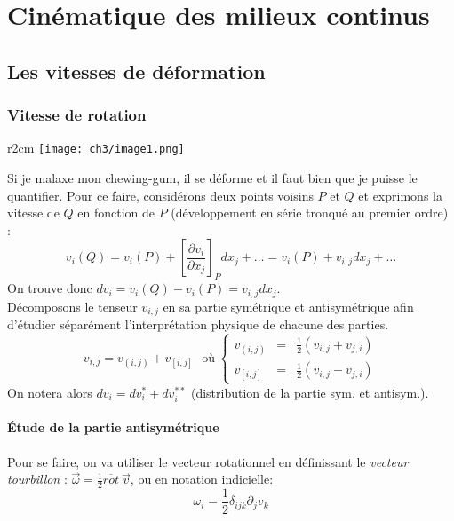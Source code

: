 \chapter{Cinématique des milieux continus}
\section{Les vitesses de déformation}

\subsection{Vitesse de rotation}
\begin{wrapfigure}[6]{r}{2cm}
	\texttt{[image: ch3/image1.png]}
\end{wrapfigure}
Si je malaxe mon chewing-gum, il se déforme et il faut bien que je puisse le quantifier.
Pour ce faire, considérons deux points voisins $P$ et $Q$ et exprimons la vitesse de $Q$
en fonction de $P$ (développement en série tronqué au premier ordre) : 
\begin{equation}
	v_i(Q) = v_i(P) + \left[
	\dfrac{\partial v_i}{\partial x_j}\right]_P dx_j + \dots = v_i(P) + v_{i,j} dx_j + \dots
\end{equation}
On trouve donc $dv_i = v_i(Q) - v_i(P) = v_{i,j}dx_j$.\\
    
Décomposons le tenseur $v_{i,j}$ en sa partie symétrique et antisymétrique afin d'étudier 
séparément l'interprétation physique de chacune des parties.
\begin{equation}
	v_{i,j} = v_{(i,j)} + v_{[i,j]}\ \ \ \text{où}\ \left\{\begin{array}{lll}
	v_{(i,j)} &=& \frac{1}{2}(v_{i,j}+v_{j,i})\\
	v_{[i,j]} &=& \frac{1}{2}(v_{i,j}-v_{j,i})
	\end{array}\right.
\end{equation}
On notera alors $dv_i = dv_i^* + dv_i^{**}$ (distribution de la partie sym. et antisym.).

\subsubsection{Étude de la partie antisymétrique}
Pour se faire, on va utiliser le vecteur rotationnel en définissant le \textit{vecteur
	tourbillon} : $\vec \omega = \frac{1}{2}\overline{rot}\ \vec{v}$, ou en notation indicielle:
\begin{equation}
	\omega_i = \frac{1}{2}\delta_{ijk}\partial_jv_k
\end{equation}
         
